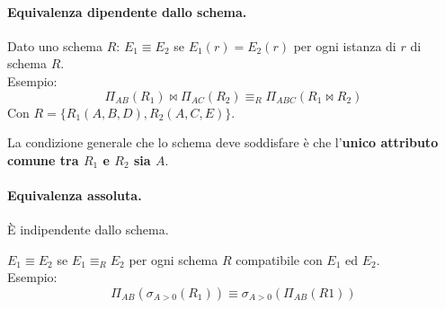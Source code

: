 \documentclass{report}
\begin{document}
\paragraph{Equivalenza dipendente dallo schema.} Dato uno schema $R$:
$E_1 \equiv E_2$ se $E_1(r) = E_2(r)$ per ogni istanza di $r$ di schema $R$.\\
Esempio:
\[ \Pi_{AB}(R_1) \bowtie \Pi_{AC}(R_2) \equiv_R \Pi_{ABC}(R_1 \bowtie R_2) \]
Con $R=\{R_1(A, B, D), R_2(A, C, E)\}$.

La condizione generale che lo schema deve soddisfare \`e che l'\textbf{unico attributo comune tra $R_1$ e $R_2$ sia $A$}.

\paragraph{Equivalenza assoluta.} \`E indipendente dallo schema.

$E_1 \equiv E_2$ se $E_1 \equiv_R E_2$ per ogni schema $R$ compatibile con $E_1$ ed $E_2$.\\
Esempio:
\[ \Pi_{AB}(\sigma_{A>0}(R_1)) \equiv \sigma_{A>0}(\Pi_{AB}(R1))\]
\end{document}
